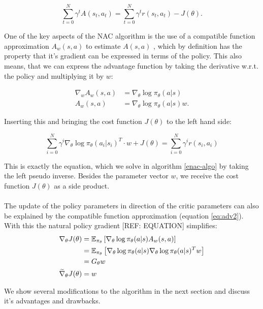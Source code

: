 \begin{equation}
	\sum_{t = 0}^{N}\gamma^t A(s_t, a_t) = \sum_{t = 0}^{N}\gamma^t r(s_t, a_t) - J(\theta).
\end{equation}

One of the key aspects of the NAC algorithm is the use of a compatible function approximation $A_w(s, a)$ to estimate $A(s, a)$ \citep{sutton2000policy}, which by definition has the property that it's gradient can be expressed in terms of the policy. This also means, that we can express the advantage function by taking the derivative w.r.t. the policy and multiplying it by $w$:

\begin{align}
	\nabla_w A_w(s,a) &= \nabla_{\theta} \log \pi_{\theta}(a|s)\label{eq:adv1}\\
	A_w(s,a) &= \nabla_{\theta} \log \pi_{\theta}(a|s)w. \label{eq:adv2}
\end{align}

 Inserting this and bringing the cost function $J(\theta)$ to the left hand side:

\begin{equation}
	\sum_{i = 0}^{N} \gamma^i \nabla_{\theta} \log \pi_{\theta}(a_i | s_i)^T \cdot w + J(\theta) = \sum_{i = 0}^{N}\gamma^i r(s_i, a_i)
\end{equation}

This is exactly the equation, which we solve in algorithm \ref{enac-algo} by taking the left pseudo inverse. Besides the parameter vector $w$, we receive the cost function $J(\theta)$ as a side product.
\\\\
The update of the policy parameters in direction of the critic parameters can also be explained by the compatible function approximation (equation \ref{eq:adv2}). With this the natural policy gradient [REF: EQUATION] simplifies:
\begin{align}
\nabla_\theta J(\theta) &= \operatorname{\mathbb{E}}_{\pi_{\theta}} \left[\nabla_{\theta} \log \pi_{\theta}(a|s) A_w(s, a)\right]\\
&= \operatorname{\mathbb{E}}_{\pi_{\theta}}  \left[\nabla_{\theta} \log \pi_{\theta}(a|s) \nabla_{\theta} \log \pi_{\theta}(a|s)^T w\right]\\
&= G_\theta w\\
\widetilde{\nabla}_{\theta} J(\theta) &= w
\end{align}

We show several modifications to the algorithm in the next section and discuss it's advantages and drawbacks.

